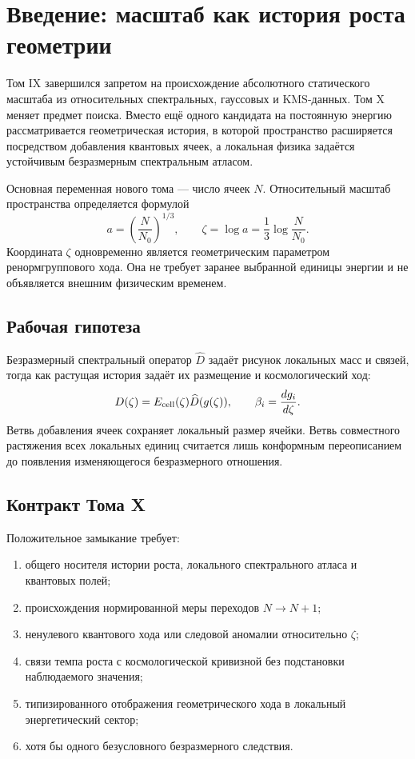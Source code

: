 \chapter{Введение: масштаб как история роста геометрии}
\label{ch:v10-introduction}

Том IX завершился запретом на происхождение абсолютного статического масштаба
из относительных спектральных, гауссовых и KMS-данных. Том X меняет предмет
поиска. Вместо ещё одного кандидата на постоянную энергию рассматривается
геометрическая история, в которой пространство расширяется посредством
добавления квантовых ячеек, а локальная физика задаётся устойчивым
безразмерным спектральным атласом.

Основная переменная нового тома --- число ячеек $N$. Относительный масштаб
пространства определяется формулой
\begin{equation}
 a=\left(\frac{N}{N_0}\right)^{1/3},
 \qquad
 \zeta=\log a=\frac13\log\frac{N}{N_0}.
 \label{eq:v10-intro-geometric-scale}
\end{equation}
Координата $\zeta$ одновременно является геометрическим параметром
ренормгруппового хода. Она не требует заранее выбранной единицы энергии и не
объявляется внешним физическим временем.

\section{Рабочая гипотеза}

Безразмерный спектральный оператор $\widehat D$ задаёт рисунок локальных
масс и связей, тогда как растущая история задаёт их размещение и
космологический ход:
\begin{equation}
 D(\zeta)=E_{\rm cell}(\zeta)\widehat D(g(\zeta)),
 \qquad
 \beta_i=\frac{dg_i}{d\zeta}.
 \label{eq:v10-intro-spectral-rg-factorization}
\end{equation}
Ветвь добавления ячеек сохраняет локальный размер ячейки. Ветвь совместного
растяжения всех локальных единиц считается лишь конформным переописанием до
появления изменяющегося безразмерного отношения.

\section{Контракт Тома X}

Положительное замыкание требует:
\begin{enumerate}
\item общего носителя истории роста, локального спектрального атласа и
квантовых полей;
\item происхождения нормированной меры переходов $N\to N+1$;
\item ненулевого квантового хода или следовой аномалии относительно $\zeta$;
\item связи темпа роста с космологической кривизной без подстановки
наблюдаемого значения;
\item типизированного отображения геометрического хода в локальный
энергетический сектор;
\item хотя бы одного безусловного безразмерного следствия.
\end{enumerate}

